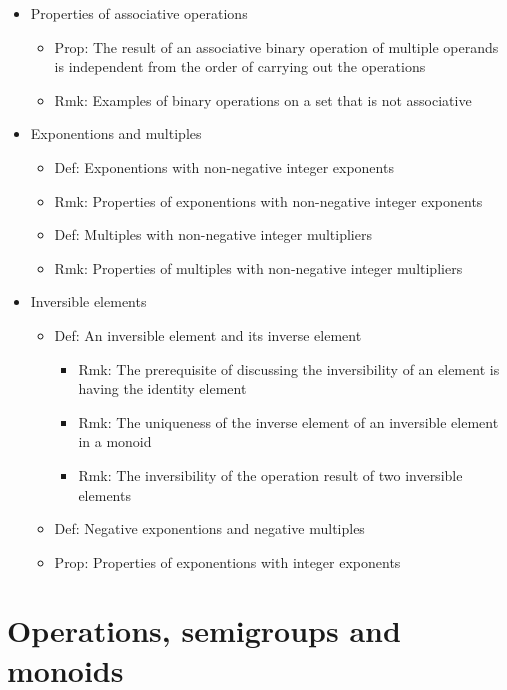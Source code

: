 \documentclass[onecolumn]{ctexart}
\begin{document}
\begin{itemize}
\begin{itemize}
  \end{itemize}
  \item Properties of associative operations
  \begin{itemize}
    \item Prop: The result of an associative binary operation of multiple operands is independent from the order of carrying out the operations
    \item Rmk: Examples of binary operations on a set that is not associative
  \end{itemize}
  \item Exponentions and multiples
  \begin{itemize}
    \item Def: Exponentions with non-negative integer exponents
    \item Rmk: Properties of exponentions with non-negative integer exponents
    \item Def: Multiples with non-negative integer multipliers
    \item Rmk: Properties of multiples with non-negative integer multipliers
  \end{itemize}
  \item Inversible elements
  \begin{itemize}
    \item Def: An inversible element and its inverse element
    \begin{itemize}
      \item Rmk: The prerequisite of discussing the inversibility of an element is having the identity element
      \item Rmk: The uniqueness of the inverse element of an inversible element in a monoid
      \item Rmk: The inversibility of the operation result of two inversible elements
    \end{itemize}
    \item Def: Negative exponentions and negative multiples
    \item Prop: Properties of exponentions with integer exponents
  \end{itemize}
\end{itemize}

\section{Operations, semigroups and monoids}
\end{document}
